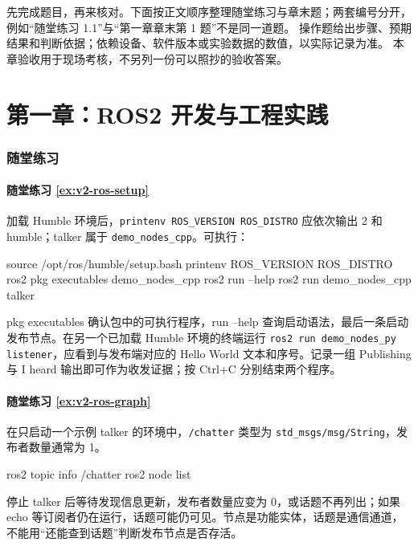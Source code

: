 \begingroup
\setlength{\emergencystretch}{3em}

先完成题目，再来核对。下面按正文顺序整理随堂练习与章末题；两套编号分开，例如“随堂练习 1.1”与“第一章章末第 1 题”不是同一道题。
操作题给出步骤、预期结果和判断依据；依赖设备、软件版本或实验数据的数值，以实际记录为准。
本章验收用于现场考核，不另列一份可以照抄的验收答案。

\section*{第一章：ROS2 开发与工程实践}
{}
\subsubsection*{随堂练习}

\paragraph*{随堂练习 \ref{ex:v2-ros-setup}}
\begin{solution}
加载 Humble 环境后，\texttt{printenv ROS\_VERSION ROS\_DISTRO} 应依次输出 2 和 humble；talker 属于 \texttt{demo\_nodes\_cpp}。可执行：
\begin{tbash}
source /opt/ros/humble/setup.bash
printenv ROS_VERSION ROS_DISTRO
ros2 pkg executables demo_nodes_cpp
ros2 run --help
ros2 run demo_nodes_cpp talker
\end{tbash}
pkg executables 确认包中的可执行程序，run --help 查询启动语法，最后一条启动发布节点。在另一个已加载 Humble 环境的终端运行 \texttt{ros2 run demo\_nodes\_py listener}，应看到与发布端对应的 Hello World 文本和序号。记录一组 Publishing 与 I heard 输出即可作为收发证据；按 Ctrl+C 分别结束两个程序。
\end{solution}

\paragraph*{随堂练习 \ref{ex:v2-ros-graph}}
\begin{solution}
在只启动一个示例 talker 的环境中，\texttt{/chatter} 类型为 \texttt{std\_msgs/msg/String}，发布者数量通常为 1。
\begin{tbash}
ros2 topic info /chatter
ros2 node list
\end{tbash}
停止 talker 后等待发现信息更新，发布者数量应变为 0，或话题不再列出；如果 echo 等订阅者仍在运行，话题可能仍可见。节点是功能实体，话题是通信通道，不能用“还能查到话题”判断发布节点是否存活。
\end{solution}


